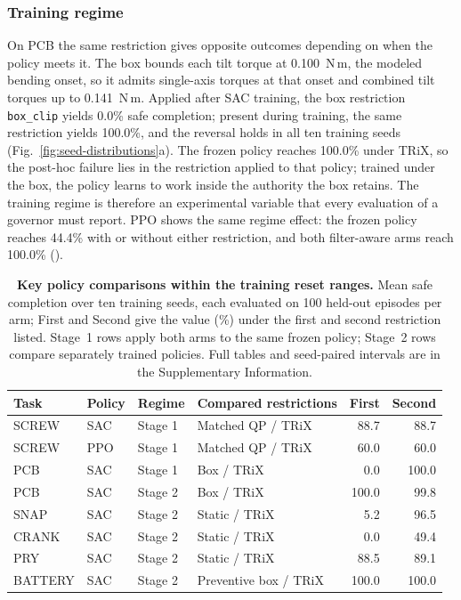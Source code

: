 \documentclass[12pt]{article}
\begin{document}
\subsubsection{Training regime}
\label{sec:policy-results}
On PCB the same restriction gives opposite outcomes depending on when the policy meets it. The box bounds each tilt torque at 0.100~N\,m, the modeled bending onset, so it admits single-axis torques at that onset and combined tilt torques up to 0.141~N\,m. Applied after SAC training, the box
restriction \texttt{box\_clip} yields 0.0\% safe completion; present during
training, the same restriction yields 100.0\%, and the reversal holds in all
ten training seeds (Fig.~\ref{fig:seed-distributions}a). The frozen policy
reaches 100.0\% under TRiX, so the post-hoc failure lies in the restriction applied to that policy; trained under the box, the policy
learns to work inside the authority the box retains. The training regime is
therefore an experimental variable that every evaluation of a governor must report. PPO shows the same regime effect: the frozen policy reaches 44.4\% with or without either restriction, and both filter-aware arms reach 100.0\% ().

\begin{table}[!tbp]
\centering\small
\caption{\textbf{Key policy comparisons within the training reset ranges.} Mean
safe completion over ten training seeds, each evaluated on 100 held-out
episodes per arm; First and Second give the value (\%) under the first and
second restriction listed. Stage~1 rows apply both arms to the same frozen policy;
Stage~2 rows compare separately trained policies. Full tables and seed-paired
intervals are in the Supplementary Information.}
\label{tab:policy-summary}
\setlength{\tabcolsep}{6pt}
\begin{tabular}{@{}llllrr@{}}
\toprule
Task & Policy & Regime & Compared restrictions & First & Second\\
\midrule
SCREW & SAC & Stage 1 & Matched QP / TRiX & 88.7 & 88.7\\
SCREW & PPO & Stage 1 & Matched QP / TRiX & 60.0 & 60.0\\
PCB & SAC & Stage 1 & Box / TRiX & 0.0 & 100.0\\
PCB & SAC & Stage 2 & Box / TRiX & 100.0 & 99.8\\
SNAP & SAC & Stage 2 & Static / TRiX & 5.2 & 96.5\\
CRANK & SAC & Stage 2 & Static / TRiX & 0.0 & 49.4\\
PRY & SAC & Stage 2 & Static / TRiX & 88.5 & 89.1\\
BATTERY & SAC & Stage 2 & Preventive box / TRiX & 100.0 & 100.0\\
\bottomrule
\end{tabular}
\end{table}
\end{document}
